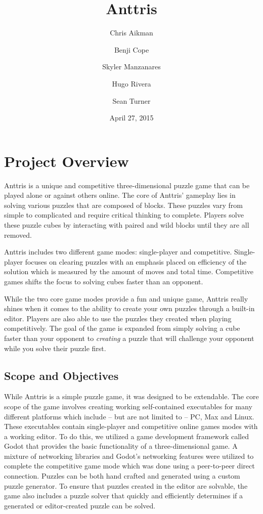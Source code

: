 \documentclass[12pt]{article}
\begin{document}
\sf %
\title{Anttris}
\author{%
\and Chris Aikman
\and Benji Cope
\and Skyler Manzanares
\and Hugo Rivera
\and Sean Turner}
\date{April 27, 2015}
\maketitle

\section{Project Overview} %
Anttris is a unique and competitive three-dimensional puzzle game that can be played alone or against others online. The core of Anttris' gameplay lies in solving various puzzles that are composed of blocks. These puzzles vary from simple to complicated and require critical thinking to complete. Players solve these puzzle cubes by interacting with paired and wild blocks until they are all removed.

Anttris includes two different game modes: single-player and competitive. Single-player focuses on clearing puzzles with an emphasis placed on efficiency of the solution which is measured by the amount of moves and total time. Competitive games shifts the focus to solving cubes faster than an opponent.

While the two core game modes provide a fun and unique game, Anttris really shines when it comes to the ability to create your own puzzles through a built-in editor. Players are also able to use the puzzles they created when playing competitively. The goal of the game is expanded from simply solving a cube faster than your opponent to \textsl{creating} a puzzle that will challenge your opponent while you solve their puzzle first.
\subsection{Scope and Objectives} %
While Anttris is a simple puzzle game, it was designed to be extendable. The core scope of the game involves creating working self-contained executables for many different platforms which include -- but are not limited to -- PC, Max and Linux. These executables contain single-player and competitive online games modes with a working editor. To do this, we utilized a game development framework called Godot \cite{godot:gameengine} that provides the basic functionality of a three-dimensional game. A mixture of networking libraries and Godot's networking features were utilized to complete the competitive game mode which was done using a peer-to-peer direct connection. Puzzles can be both hand crafted and generated using a custom puzzle generator. To ensure that puzzles created in the editor are solvable, the game also includes a puzzle solver that quickly and efficiently determines if a generated or editor-created puzzle can be solved.
\end{document}
